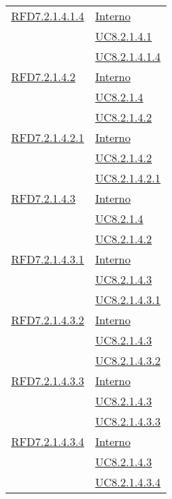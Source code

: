 \begin{longtable}{|>{\centering}m{5cm}|m{5cm}<{\centering}|}
\hyperlink{RFD7.2.1.4.1.4}{RFD7.2.1.4.1.4} & \hyperlink{Interno}{Interno}\\
& \hyperref[UC8.2.1.4.1]{UC8.2.1.4.1}\\
& \hyperref[UC8.2.1.4.1.4]{UC8.2.1.4.1.4}\\ \hline

\hyperlink{RFD7.2.1.4.2}{RFD7.2.1.4.2} & \hyperlink{Interno}{Interno}\\
& \hyperref[UC8.2.1.4]{UC8.2.1.4}\\
& \hyperref[UC8.2.1.4.2]{UC8.2.1.4.2}\\ \hline

\hyperlink{RFD7.2.1.4.2.1}{RFD7.2.1.4.2.1} & \hyperlink{Interno}{Interno}\\
& \hyperref[UC8.2.1.4.2]{UC8.2.1.4.2}\\
& \hyperref[UC8.2.1.4.2.1]{UC8.2.1.4.2.1}\\ \hline

\hyperlink{RFD7.2.1.4.3}{RFD7.2.1.4.3} & \hyperlink{Interno}{Interno}\\
& \hyperref[UC8.2.1.4]{UC8.2.1.4}\\
& \hyperref[UC8.2.1.4.2]{UC8.2.1.4.2}\\ \hline

\hyperlink{RFD7.2.1.4.3.1}{RFD7.2.1.4.3.1} & \hyperlink{Interno}{Interno}\\
& \hyperref[UC8.2.1.4.3]{UC8.2.1.4.3}\\
& \hyperref[UC8.2.1.4.3.1]{UC8.2.1.4.3.1}\\ \hline

\hyperlink{RFD7.2.1.4.3.2}{RFD7.2.1.4.3.2} & \hyperlink{Interno}{Interno}\\
& \hyperref[UC8.2.1.4.3]{UC8.2.1.4.3}\\
& \hyperref[UC8.2.1.4.3.2]{UC8.2.1.4.3.2}\\ \hline

\hyperlink{RFD7.2.1.4.3.3}{RFD7.2.1.4.3.3} & \hyperlink{Interno}{Interno}\\
& \hyperref[UC8.2.1.4.3]{UC8.2.1.4.3}\\
& \hyperref[UC8.2.1.4.3.3]{UC8.2.1.4.3.3}\\ \hline

\hyperlink{RFD7.2.1.4.3.4}{RFD7.2.1.4.3.4} & \hyperlink{Interno}{Interno}\\
& \hyperref[UC8.2.1.4.3]{UC8.2.1.4.3}\\
& \hyperref[UC8.2.1.4.3.4]{UC8.2.1.4.3.4}\\ \hline


\end{longtable}
